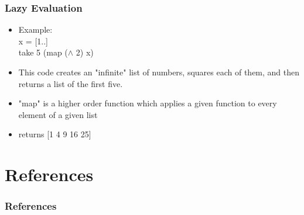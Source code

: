 \documentclass[presentation.tex]{subfiles}
\begin{document}
\begin{frame}
  \frametitle{Lazy Evaluation}
    	\begin{itemize}
 \item Example: \\ \;
  x = [1..] \\
  take 5 (map ($\wedge$ 2) x) \\
 \item This code creates an "infinite" list of numbers, squares each of them, and then returns a list of the first five. \\
 \item "map" is a higher order function which applies a given function to every element of a given list
\item returns [1 4 9 16 25]
	  \end{itemize} 
\end{frame}  

\section{References}
\begin{frame}
  \frametitle{References}


\end{frame}
\end{document}
